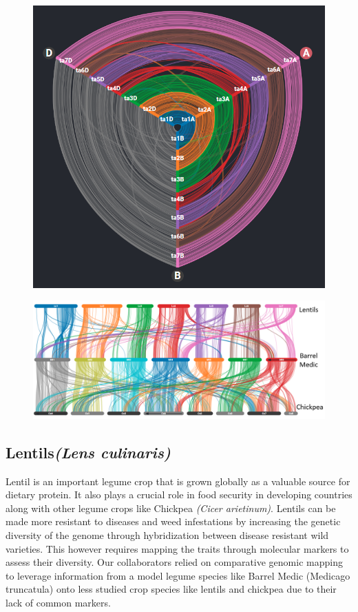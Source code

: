 \begin{figure}
  \centering
  \includegraphics[width=0.65\linewidth]{images/ch_6_wheat.PNG}
  \label{fig:ch_6_wheat}
\end{figure}


\begin{figure}
  \centering
  \includegraphics[width=1\linewidth]{images/ch_6_lentils.png}
  \label{fig:ch_6_lentils}
\end{figure}


\subsection{Lentils\textit{(Lens culinaris)}}
Lentil is an important legume crop that is grown globally as a valuable source for dietary protein. It also plays a crucial role in food security in developing countries along with other legume crops like Chickpea \textit{(Cicer arietinum)}\cite{varshney2013draft}. Lentils can be made more resistant to diseases and weed infestations by increasing the genetic diversity of the genome through hybridization between disease resistant wild varieties. This however requires mapping the traits through molecular markers to assess their diversity. Our collaborators relied on comparative genomic mapping to leverage information from a model legume species like Barrel Medic (Medicago truncatula) onto less studied crop species like lentils and chickpea due to their lack of common markers.

